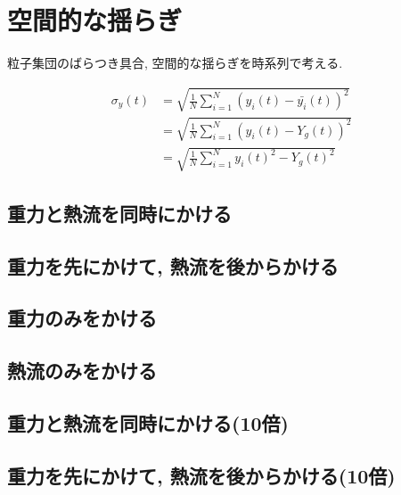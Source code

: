 


\section{空間的な揺らぎ}

粒子集団のばらつき具合, 空間的な揺らぎを時系列で考える.

\begin{align}
  \sigma_{y} (t)
  &= \sqrt{\frac{1}{N} \sum_{i=1}^{N} (y_i (t) - \bar{y_i}(t) )^2} \\
  &= \sqrt{\frac{1}{N} \sum_{i=1}^{N} (y_i (t) - Y_g (t) )^2} \\
  &= \sqrt{\frac{1}{N} \sum_{i=1}^{N} {{y_i} (t)}^2 - {{Y_g} (t)}^2}
\end{align}

\subsection{重力と熱流を同時にかける}



\subsection{重力を先にかけて, 熱流を後からかける}



\subsection{重力のみをかける}



\subsection{熱流のみをかける}



\subsection{重力と熱流を同時にかける(10倍)}



\subsection{重力を先にかけて, 熱流を後からかける(10倍)}

